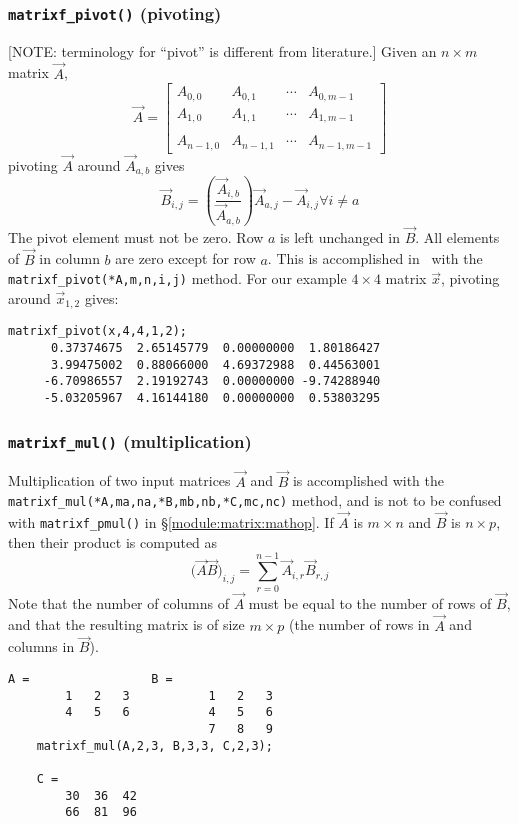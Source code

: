 \subsubsection{{\tt matrixf\_pivot()} (pivoting)}
\label{module:matrix:pivot}
[NOTE: terminology for ``pivot'' is different from literature.]
Given an $n \times m$ matrix $\vec{A}$,
\[
    \vec{A} = 
    \begin{bmatrix}
        A_{0,0}     & A_{0,1}   & \cdots  & A_{0,m-1} \\
        A_{1,0}     & A_{1,1}   & \cdots  & A_{1,m-1} \\
        \\
        A_{n-1,0}   & A_{n-1,1} & \cdots  & A_{n-1,m-1}
    \end{bmatrix}
\]
pivoting $\vec{A}$ around $\vec{A}_{a,b}$ gives
\[
    \vec{B}_{i,j} = \left(
                    \frac{\vec{A}_{i,b}}{\vec{A}_{a,b}}
                    \right)
                    \vec{A}_{a,j} - \vec{A}_{i,j}
                    \forall i \ne a
\]
The pivot element must not be zero.
Row $a$ is left unchanged in $\vec{B}$.
All elements of $\vec{B}$ in column $b$ are zero except for row $a$.
This is accomplished in \liquid\ with the
{\tt matrixf\_pivot(*A,m,n,i,j)} method.
For our example $4 \times 4$ matrix $\vec{x}$, pivoting around
$\vec{x}_{1,2}$ gives:
%
\begin{Verbatim}[fontsize=\small]
    matrixf_pivot(x,4,4,1,2);
      0.37374675  2.65145779  0.00000000  1.80186427
      3.99475002  0.88066000  4.69372988  0.44563001
     -6.70986557  2.19192743  0.00000000 -9.74288940
     -5.03205967  4.16144180  0.00000000  0.53803295
\end{Verbatim}

\subsubsection{{\tt matrixf\_mul()} (multiplication)}
\label{module:matrix:mul}
Multiplication of two input matrices $\vec{A}$ and $\vec{B}$ is accomplished
with the {\tt matrixf\_mul(*A,ma,na,*B,mb,nb,*C,mc,nc)} method,
and is not to be confused with {\tt matrixf\_pmul()}
in \S\ref{module:matrix:mathop}.
If $\vec{A}$ is $m \times n$ and $\vec{B}$ is $n \times p$, then their product
is computed as
%
\begin{equation}
\label{eqn:matrix:mul}
    \bigl( \vec{A} \vec{B} \bigr)_{i,j}
        = \sum_{r=0}^{n-1} { \vec{A}_{i,r} \vec{B}_{r,j} }
\end{equation}
%
Note that the number of columns of $\vec{A}$ must be equal to the number of
rows of $\vec{B}$, and that the resulting matrix is of size $m \times p$
(the number of rows in $\vec{A}$ and columns in $\vec{B}$).
%
\begin{Verbatim}[fontsize=\small]
    A =                 B =
        1   2   3           1   2   3
        4   5   6           4   5   6
                            7   8   9
    matrixf_mul(A,2,3, B,3,3, C,2,3);
    
    C =
        30  36  42
        66  81  96
\end{Verbatim}


